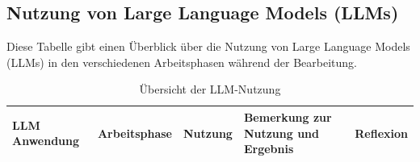 \documentclass[../main.tex]{subfiles}
\begin{document}
\begin{appendices}
    \chapter{Nutzung von Large Language Models (LLMs)}
    \label{appendix:LLMNutzung}

    Diese Tabelle gibt einen Überblick über die Nutzung von Large Language Models (LLMs) in den verschiedenen Arbeitsphasen während der Bearbeitung.

    \begin{tiny}
        \begin{longtable}{p{}|p{}|p{}|p{}|p{}}
            \caption{Übersicht der LLM-Nutzung} \label{tab:LLMNutzung}                                                                                                                                                                                                                                                                                                                                                                                                                                                                                                                                                                                                                    \\
            \hline
            \textbf{LLM Anwendung}                       & \textbf{Arbeitsphase}        & \textbf{Nutzung}                                                                                                                                   & \textbf{Bemerkung zur Nutzung und Ergebnis}                                                                                                          & \textbf{Reflexion}                                                                                                                                                                                                                                                                  \\ \hline
            \endfirsthead


\end{longtable}
\end{tiny}
\end{appendices}
\end{document}
